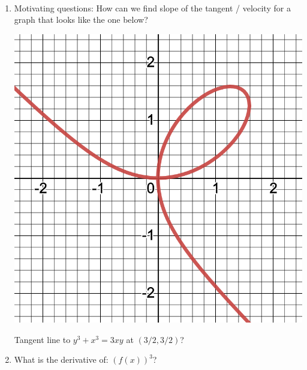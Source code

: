 \documentclass[11pt,fleqn]{article}
\begin{document}
\renewcommand{\headrulewidth}{0pt}
\newcommand{\blank}[1]{\rule{#1}{0.75pt}}
\newcommand{\bc}{\begin{center}}
\newcommand{\ec}{\end{center}}
\renewcommand{\d}{\displaystyle}

\vspace*{-0.7in}

\begin{center}
  \large
  \\
\end{center}
\begin{enumerate}
\item Motivating questions: How can we find slope of the tangent / velocity for a graph that looks like the one below?\\

\begin{multicols}{2}
\includegraphics[scale=.25]{loop.png}

Tangent line to $y^3+x^3=3xy$ at $(3/2,3/2)$?

\end{multicols}

\vspace{1in}
 
 \item What is the derivative of: \quad \large{${\displaystyle{\left(f(x) \right)^3}}$}\quad?\\
 

\end{enumerate}
\end{document}
